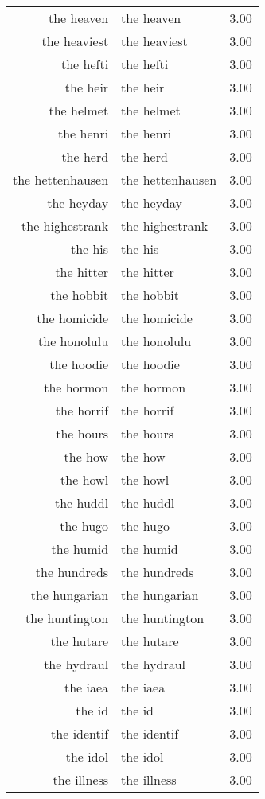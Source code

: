 \begin{table}[ht]
\begin{tabular}{rlr}
  the heaven & the heaven & 3.00 \\ 
  the heaviest & the heaviest & 3.00 \\ 
  the hefti & the hefti & 3.00 \\ 
  the heir & the heir & 3.00 \\ 
  the helmet & the helmet & 3.00 \\ 
  the henri & the henri & 3.00 \\ 
  the herd & the herd & 3.00 \\ 
  the hettenhausen & the hettenhausen & 3.00 \\ 
  the heyday & the heyday & 3.00 \\ 
  the highestrank & the highestrank & 3.00 \\ 
  the his & the his & 3.00 \\ 
  the hitter & the hitter & 3.00 \\ 
  the hobbit & the hobbit & 3.00 \\ 
  the homicide & the homicide & 3.00 \\ 
  the honolulu & the honolulu & 3.00 \\ 
  the hoodie & the hoodie & 3.00 \\ 
  the hormon & the hormon & 3.00 \\ 
  the horrif & the horrif & 3.00 \\ 
  the hours & the hours & 3.00 \\ 
  the how & the how & 3.00 \\ 
  the howl & the howl & 3.00 \\ 
  the huddl & the huddl & 3.00 \\ 
  the hugo & the hugo & 3.00 \\ 
  the humid & the humid & 3.00 \\ 
  the hundreds & the hundreds & 3.00 \\ 
  the hungarian & the hungarian & 3.00 \\ 
  the huntington & the huntington & 3.00 \\ 
  the hutare & the hutare & 3.00 \\ 
  the hydraul & the hydraul & 3.00 \\ 
  the iaea & the iaea & 3.00 \\ 
  the id & the id & 3.00 \\ 
  the identif & the identif & 3.00 \\ 
  the idol & the idol & 3.00 \\ 
  the illness & the illness & 3.00 \\ 

\end{tabular}
\end{table}
